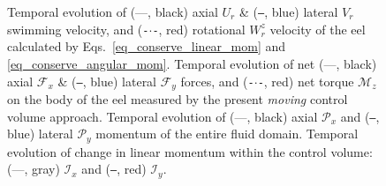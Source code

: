 \documentclass[review]{elsarticle}
\def \cP{{\mathcal{P}}}
\begin{document}
\begin{figure}[H]
  \centering
  \caption{
  Temporal evolution of (---, black) axial $U_r$ \& (\texttt{---}, blue) lateral $V_r$ swimming velocity,
  and (\texttt{-}$\cdot$\texttt{-}, red) rotational $W_r^z$ velocity of the eel calculated by Eqs.~\eqref{eq_conserve_linear_mom} 
  and \eqref{eq_conserve_angular_mom}.
   Temporal evolution of net (---, black) axial $\mathcal{F}_x$ \& (\texttt{---}, blue) lateral $\mathcal{F}_y$ forces,
   and (\texttt{-}$\cdot$\texttt{-}, red) net torque $\mathcal{M}_z$ on the body of the eel 
   measured by the present \emph{moving} control volume approach.
   Temporal evolution of (---, black) axial $\cP_x$ and (\texttt{---}, blue) lateral $\cP_y$ momentum
   of the entire fluid domain. Temporal evolution of change in linear momentum within
   the control volume: (---, gray) $\mathcal{I}_x$ and (\texttt{---}, red) $\mathcal{I}_y$.}
  \label{fig_undulating_eel}
\end{figure}
\end{document}

